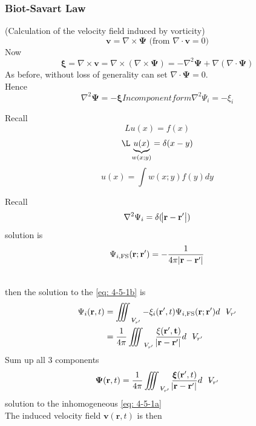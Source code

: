 \subsubsection{Biot-Savart Law}
(Calculation of the velocity field induced by vorticity)
\[
\mathbf{v} = \nabla\times\boldsymbol{\Psi}\text{ (from $\nabla\cdot\mathbf{v} = 0$)}
\]
Now
\[
\boldsymbol{\xi} = \nabla\times\mathbf{v} = \nabla\times\left(\nabla\times\boldsymbol{\Psi}\right) = -\nabla^2\boldsymbol{\Psi} + \nabla\left(\nabla\cdot\boldsymbol{\Psi}\right)
\]
As before, without loss of generality can set $\nabla\cdot\boldsymbol{\Psi} = 0$.\\
Hence 
\begin{subequations}
\begin{equation}
\boxed{\nabla^2\boldsymbol{\Psi} = -\boldsymbol{\xi}}
\label{eq: 4-5-1a}
\end{equation}
In component form
\begin{equation}
\nabla^2\Psi_i = -\xi_i
\label{eq: 4-5-1b}
\end{equation}
\end{subequations}
\begin{minipage}{0.4\textwidth}
Recall
\[
Lu(x) = f(x)
\]
\[
\L\underbrace{u(x)}_{w(x;y)} = \delta(x-y)
\]
\[
u(x) = \int w(x;y)f(y)dy
\]
\end{minipage}\hfill
\begin{minipage}{0.4\textwidth}
Recall
\[
\nabla^2\Psi_i = \delta(\abs{\mathbf{r}-\mathbf{r'}})
\]
solution is 
\[
\Psi_{i,\text{FS}}(\mathbf{r};\mathbf{r'}) = -\frac{1}{4\pi\abs{\mathbf{r}-\mathbf{r'}}}
\]
\end{minipage}\\
then the solution to the \eqref{eq: 4-5-1b} is
\begin{align*}
\Psi_i(\mathbf{r},t) 
&= \iiint_{\volume_{r'}}-\xi_i(\mathbf{r'},t)\Psi_{i,\text{FS}}(\mathbf{r};\mathbf{r'}) d\volume_{r'} \\
&= \frac{1}{4\pi}\iiint_{\volume_{r'}}\frac{\xi(\mathbf{r',t})}{\abs{\mathbf{r}-\mathbf{r'}}}d\volume_{r'}
\end{align*}
Sum up all 3 components
\begin{equation}
\boldsymbol{\Psi}(\mathbf{r},t) = \frac{1}{4\pi}\iiint_{\volume_{r'}}\frac{\boldsymbol{\xi}(\mathbf{r'},t)}{\abs{\mathbf{r}-\mathbf{r'}}}d\volume_{r'}
\label{eq: 4-5-2}
\end{equation}
solution to the inhomogeneous \eqref{eq: 4-5-1a}\\
The induced velocity field $\mathbf{v}(\mathbf{r},t)$ is then
